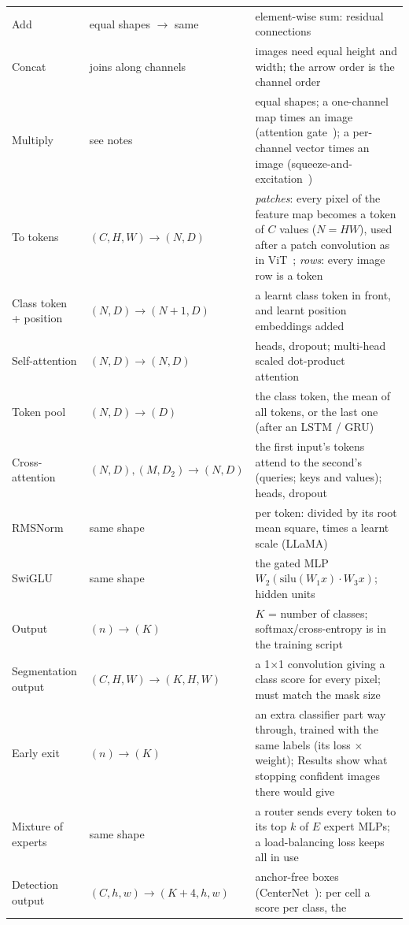 \documentclass[11pt,a4paper]{article}
\begin{document}
\begin{longtable}{@{}p{2.9cm}p{3.7cm}p{8.4cm}@{}}
Add & equal shapes $\rightarrow$ same & element-wise sum: residual connections~\cite{he2015resnet}\\
Concat & joins along channels & images need equal height and width; the arrow order is the channel order\\
Multiply & see notes & equal shapes; a one-channel map times an image (attention gate~\cite{oktay2018attention}); a per-channel vector times an image (squeeze-and-excitation~\cite{hu2017senet})\\
To tokens & $(C,H,W)\rightarrow(N,D)$ & \emph{patches}: every pixel of the feature map becomes a token of $C$ values ($N=HW$), used after a patch convolution as in ViT~\cite{dosovitskiy2020vit}; \emph{rows}: every image row is a token\\
Class token + position & $(N,D)\rightarrow(N{+}1,D)$ & a learnt class token in front, and learnt position embeddings added\\
Self-attention & $(N,D)\rightarrow(N,D)$ & heads, dropout; multi-head scaled dot-product attention~\cite{vaswani2017attention}\\
Token pool & $(N,D)\rightarrow(D)$ & the class token, the mean of all tokens, or the last one (after an LSTM / GRU)\\
Cross-attention & $(N,D),(M,D_2)\rightarrow(N,D)$ & the first input's tokens attend to the second's (queries; keys and values); heads,
dropout\\
RMSNorm & same shape & per token: divided by its root mean square, times a learnt scale (LLaMA)\\
SwiGLU & same shape & the gated MLP $W_2(\mathrm{silu}(W_1x)\cdot W_3x)$; hidden units\\
Output & $(n)\rightarrow(K)$ & $K$ = number of classes; softmax/cross-entropy is in the training script\\
Segmentation output & $(C,H,W)\rightarrow(K,H,W)$ & a 1$\times$1 convolution giving a class score for every pixel; must match the mask size\\
Early exit & $(n)\rightarrow(K)$ & an extra classifier part way through, trained with the same labels (its loss $\times$ weight); Results
show what stopping confident images there would give\\
Mixture of experts & same shape & a router sends every token to its top $k$ of $E$ expert MLPs; a load-balancing loss keeps all in use\\
Detection output & $(C,h,w)\rightarrow(K{+}4,h,w)$ & anchor-free boxes (CenterNet~\cite{zhou2019centernet}): per cell a score per class, the

\end{longtable}
\end{document}
